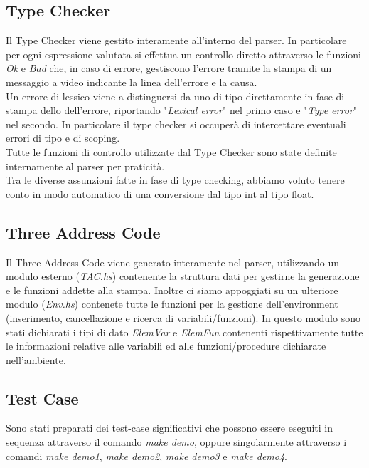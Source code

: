 \documentclass[12pt]{article}
\begin{document}
\subsection{Type Checker}
Il Type Checker viene gestito interamente all'interno del parser. In particolare per ogni espressione valutata si effettua un controllo diretto attraverso le funzioni \textit{Ok} e \textit{Bad} che, in caso di errore, gestiscono l'errore tramite la stampa di un messaggio a video indicante la linea dell'errore e la causa.\\
Un errore di lessico viene a distinguersi da uno di tipo direttamente in fase di stampa dello dell'errore, riportando "\textit{Lexical error}" nel primo caso e "\textit{Type error}" nel secondo. In particolare il type checker si occuperà di intercettare eventuali errori di tipo e di scoping.\\
Tutte le funzioni di controllo utilizzate dal Type Checker sono state definite internamente al parser per praticità.\\
Tra le diverse assunzioni fatte in fase di type checking, abbiamo voluto tenere conto in modo automatico di una conversione dal tipo int al tipo float.

\subsection{Three Address Code}
Il Three Address Code viene generato interamente nel parser, utilizzando un modulo esterno (\textit{TAC.hs}) contenente la struttura dati per gestirne la generazione e le funzioni addette alla stampa. Inoltre ci siamo appoggiati su un ulteriore modulo (\textit{Env.hs}) contenete tutte le funzioni per la gestione dell'environment (inserimento, cancellazione e ricerca di variabili/funzioni).
In questo modulo sono stati dichiarati i tipi di dato \textit{ElemVar} e \textit{ElemFun} contenenti rispettivamente tutte le informazioni relative alle variabili ed alle funzioni/procedure dichiarate nell'ambiente.

\subsection{Test Case}
Sono stati preparati dei test-case significativi che possono essere eseguiti in sequenza attraverso il comando \textit{make demo}, oppure singolarmente attraverso i comandi \textit{make demo1}, \textit{make demo2}, \textit{make demo3} e \textit{make demo4}.
\end{document}
